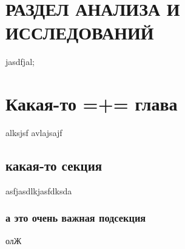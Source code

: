 \chapter*{РАЗДЕЛ АНАЛИЗА И ИССЛЕДОВАНИЙ}

jasdfjal;
\chapter{Какая-то =+= глава}
alksjsf
avlajsajf
\section{какая-то секция}
asfjasdlkjasfdksda
\subsection{а это очень важная подсекция}
олЖ

